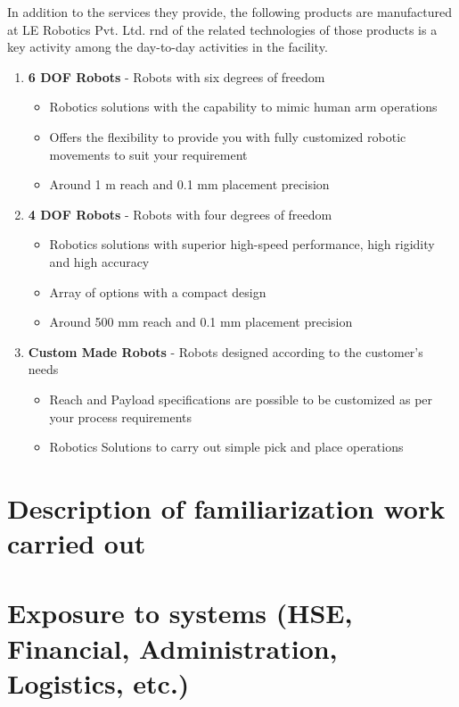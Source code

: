 \documentclass[a4paper,12pt]{report}%
\begin{document}
In addition to the services they provide, the following products are manufactured at LE Robotics Pvt. Ltd. \ac{rnd} of the related technologies of those products is a key activity among the day-to-day activities in the facility. 


\begin{enumerate}
	\item \textbf{6 DOF Robots} - Robots with six degrees of freedom
	\begin{itemize}
		\item Robotics solutions with the capability to mimic human arm operations
		\item Offers the flexibility to provide you with fully customized robotic movements to suit your requirement
		\item  Around 1 m reach and 0.1 mm placement precision
	\end{itemize}
	
	\item\textbf{ 4 DOF Robots} - Robots with four degrees of freedom
	\begin{itemize}
		\item Robotics solutions with superior high-speed performance, high rigidity and high accuracy
		\item Array of options with a compact design
		\item Around 500 mm reach and 0.1 mm placement precision
	\end{itemize}
	
	\item \textbf{Custom Made Robots} - Robots designed according to the customer's needs
	\begin{itemize}
		\item Reach and Payload specifications are possible to be customized as per your process requirements
		\item Robotics Solutions to carry out simple pick and place operations
	\end{itemize}
\end{enumerate}





\chapter{Description of familiarization work carried out}

\chapter{Exposure to systems (HSE, Financial, Administration, Logistics, etc.)}
\end{document}
